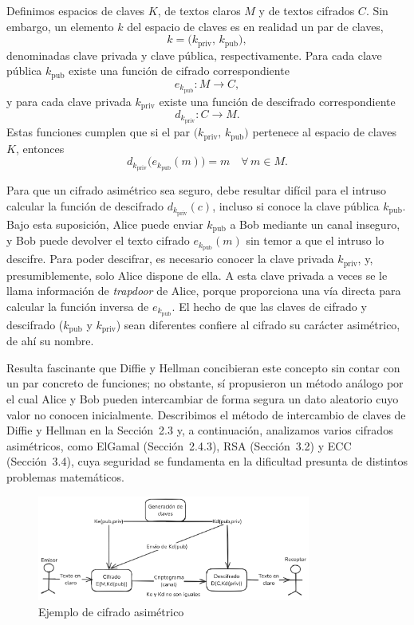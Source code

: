 Definimos espacios de claves \(K\), de textos claros \(M\) y de textos cifrados \(C\). Sin embargo, un elemento \(k\) del espacio de claves es en realidad un par de claves,
\[
k = \bigl(k_{\text{priv}},\,k_{\text{pub}}\bigr),
\]
denominadas clave privada y clave pública, respectivamente. Para cada clave pública \(k_{\text{pub}}\) existe una función de cifrado correspondiente
\[
e_{k_{\text{pub}}}: M \longrightarrow C,
\]
y para cada clave privada \(k_{\text{priv}}\) existe una función de descifrado correspondiente
\[
d_{k_{\text{priv}}}: C \longrightarrow M.
\]
Estas funciones cumplen que si el par \(\bigl(k_{\text{priv}},\,k_{\text{pub}}\bigr)\) pertenece al espacio de claves \(K\), entonces
\[
d_{k_{\text{priv}}}\bigl(e_{k_{\text{pub}}}(m)\bigr) = m
\quad\forall\,m \in M.
\]

Para que un cifrado asimétrico sea seguro, debe resultar difícil para el intruso calcular la función de descifrado \(d_{k_{\text{priv}}}(c)\), incluso si conoce la clave pública \(k_{\text{pub}}\). Bajo esta suposición, Alice puede enviar \(k_{\text{pub}}\) a Bob mediante un canal inseguro, y Bob puede devolver el texto cifrado \(e_{k_{\text{pub}}}(m)\) sin temor a que el intruso lo descifre. Para poder descifrar, es necesario conocer la clave privada \(k_{\text{priv}}\), y, presumiblemente, solo Alice dispone de ella. A esta clave privada a veces se le llama información de \emph{trapdoor} de Alice, porque proporciona una vía directa para calcular la función inversa de \(e_{k_{\text{pub}}}\). El hecho de que las claves de cifrado y descifrado (\(k_{\text{pub}}\) y \(k_{\text{priv}}\)) sean diferentes confiere al cifrado su carácter asimétrico, de ahí su nombre.

Resulta fascinante que Diffie y Hellman concibieran este concepto sin contar con un par concreto de funciones; no obstante, sí propusieron un método análogo por el cual Alice y Bob pueden intercambiar de forma segura un dato aleatorio cuyo valor no conocen inicialmente. Describimos el método de intercambio de claves de Diffie y Hellman en la Sección~2.3 y, a continuación, analizamos varios cifrados asimétricos, como ElGamal (Sección~2.4.3), RSA (Sección~3.2) y ECC (Sección~3.4), cuya seguridad se fundamenta en la dificultad presunta de distintos problemas matemáticos.

\begin{figure}[H]
    \centering
    \includegraphics[width=0.8\textwidth]{imagenes/Cifrado_asimetrico.png}
    \caption{Ejemplo de cifrado asimétrico}
    \label{fig:cifrado_asimetrico}
\end{figure}

